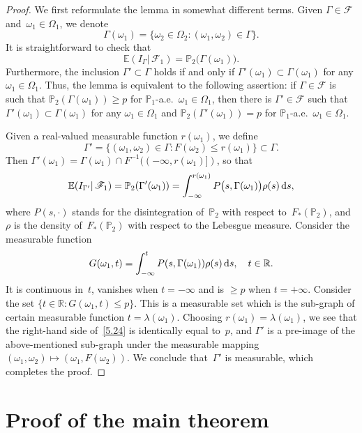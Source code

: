 \documentclass[JEP,XML,SOM,Unicode,ThmDefs]{cedram}
\let\mathcal\mathscr
\theoremstyle{plain}
\numberwithin{equation}{section}
\newcommand{\dd}{{\textup d}}
\newcommand{\R}{{\mathbb R}}
\newcommand{\IP}{{\mathbb P}}
\newcommand{\E}{{\mathbb E}}
\newcommand{\FF}{{\mathcal F}}
\begin{document}
\begin{proof}
We first reformulate the lemma in somewhat different terms. Given $\Gamma\in\FF$ and~$\omega_1\in\Omega_1$, we denote
\[
\Gamma(\omega_1)
=\{\omega_2\in\Omega_2:(\omega_1,\omega_2)\in\Gamma\}.
\]
It is straightforward to check that
\[
\E(I_\Gamma|\,\FF_1)=\IP_2\bigl(\Gamma(\omega_1)\bigr).
\]
Furthermore, the inclusion $\Gamma'\subset\Gamma$ holds if and only if $\Gamma'(\omega_1)\subset\Gamma(\omega_1)$ for any $\omega_1\in\Omega_1$. Thus, the lemma is equivalent to the following assertion: if $\Gamma\in\FF$ is such that $\IP_2(\Gamma(\omega_1))\ge p$ for $\IP_1$-a.e.\ $\omega_1\in\Omega_1$, then there is $\Gamma'\in\FF$ such that $\Gamma'(\omega_1)\subset\Gamma(\omega_1)$ for any $\omega_1\in\Omega_1$ and $\IP_2(\Gamma'(\omega_1))= p$ for $\IP_1$-a.e.\ $\omega_1\in\Omega_1$.

Given a real-valued measurable function $r(\omega_1)$, we define
\[
\Gamma'=\{(\omega_1,\omega_2)\in\Gamma:
F(\omega_2)\le r(\omega_1)\}\subset\Gamma.
\]
Then $\Gamma'(\omega_1)=\Gamma(\omega_1)\cap F^{-1}((-\infty,r(\omega_1)])$, so that
\begin{equation} \label{5.24}
\E(I_{\Gamma'}|\,\FF_1)=\IP_2(\Gamma'(\omega_1))
=\int_{-\infty}^{r(\omega_1)}
P\bigl(s,\Gamma(\omega_1)\bigr)\rho(s)\,\dd s,
\end{equation}
where $P(s,\cdot)$ stands for the disintegration of~$\IP_2$ with respect to~$F_*(\IP_2)$, and~$\rho$ is the density of~$F_*(\IP_2)$ with respect to the Lebesgue measure. Consider the measurable function
\[
G(\omega_1, t) = \int_{-\infty}^t P(s, \Gamma(\omega_1)) \rho(s)\,\dd s, \quad t\in\R.
\]
It is continuous in~$t$, vanishes when $t=-\infty$ and is $\ge p$ when $t=+\infty$. Consider the set $\{t\in \R:G(\omega_1,t)\le p\}$. This is a measurable set which is the sub-graph of certain measurable function $t=\lambda(\omega_1)$. Choosing $r(\omega_1) = \lambda(\omega_1)$, we see that the right-hand side of~\eqref{5.24} is identically equal to~$p$, and $\Gamma'$ is a pre-image of the above-mentioned sub-graph under the measurable mapping $(\omega_1, \omega_2)\mapsto (\omega_1, F(\omega_2))$. We conclude that~$\Gamma'$ is measurable, which completes the proof.
\end{proof}

\section{Proof of the main theorem}
\label{s3}
\end{document}
